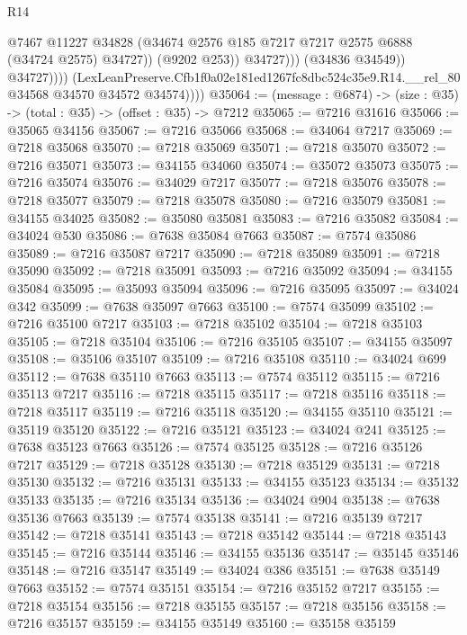 \begin{lexlean}{R14}
\begin{coremodule}
                              @7467
                              @11227
                              @34828
                              (@34674 @2576 @185 @7217 @7217 @2575 @6888 (@34724 @2575) @34727))
                            (@9202 @253))
                          @34727)))
                    (@34836 @34549))
                  @34727))))
          (LexLeanPreserve.Cfb1f0a02e181ed1267fc8dbc524c35e9.R14.__rel_80
            @34568
            @34570
            @34572
            @34574))))
@35064 := (message : @6874) -> (size : @35) -> (total : @35) -> (offset : @35) -> @7212
@35065 := @7216 @31616
@35066 := @35065 @34156
@35067 := @7216 @35066
@35068 := @34064 @7217
@35069 := @7218 @35068
@35070 := @7218 @35069
@35071 := @7218 @35070
@35072 := @7216 @35071
@35073 := @34155 @34060
@35074 := @35072 @35073
@35075 := @7216 @35074
@35076 := @34029 @7217
@35077 := @7218 @35076
@35078 := @7218 @35077
@35079 := @7218 @35078
@35080 := @7216 @35079
@35081 := @34155 @34025
@35082 := @35080 @35081
@35083 := @7216 @35082
@35084 := @34024 @530
@35086 := @7638 @35084 @7663
@35087 := @7574 @35086
@35089 := @7216 @35087 @7217
@35090 := @7218 @35089
@35091 := @7218 @35090
@35092 := @7218 @35091
@35093 := @7216 @35092
@35094 := @34155 @35084
@35095 := @35093 @35094
@35096 := @7216 @35095
@35097 := @34024 @342
@35099 := @7638 @35097 @7663
@35100 := @7574 @35099
@35102 := @7216 @35100 @7217
@35103 := @7218 @35102
@35104 := @7218 @35103
@35105 := @7218 @35104
@35106 := @7216 @35105
@35107 := @34155 @35097
@35108 := @35106 @35107
@35109 := @7216 @35108
@35110 := @34024 @699
@35112 := @7638 @35110 @7663
@35113 := @7574 @35112
@35115 := @7216 @35113 @7217
@35116 := @7218 @35115
@35117 := @7218 @35116
@35118 := @7218 @35117
@35119 := @7216 @35118
@35120 := @34155 @35110
@35121 := @35119 @35120
@35122 := @7216 @35121
@35123 := @34024 @241
@35125 := @7638 @35123 @7663
@35126 := @7574 @35125
@35128 := @7216 @35126 @7217
@35129 := @7218 @35128
@35130 := @7218 @35129
@35131 := @7218 @35130
@35132 := @7216 @35131
@35133 := @34155 @35123
@35134 := @35132 @35133
@35135 := @7216 @35134
@35136 := @34024 @904
@35138 := @7638 @35136 @7663
@35139 := @7574 @35138
@35141 := @7216 @35139 @7217
@35142 := @7218 @35141
@35143 := @7218 @35142
@35144 := @7218 @35143
@35145 := @7216 @35144
@35146 := @34155 @35136
@35147 := @35145 @35146
@35148 := @7216 @35147
@35149 := @34024 @386
@35151 := @7638 @35149 @7663
@35152 := @7574 @35151
@35154 := @7216 @35152 @7217
@35155 := @7218 @35154
@35156 := @7218 @35155
@35157 := @7218 @35156
@35158 := @7216 @35157
@35159 := @34155 @35149
@35160 := @35158 @35159

\end{coremodule}
\end{lexlean}

